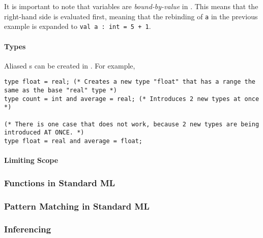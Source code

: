 It is important to note that variables are \emph{bound-by-value} in .
This means that the right-hand side is evaluated first, meaning that the rebinding of \texttt{a} in the previous example is expanded to \texttt{val a : int = 5 + 1}.

\paragraph{Types}\label{par:Functional-SML-Type_Declarations}
Aliased s can be created in .
For example,
\begin{verbatim}
type float = real; (* Creates a new type "float" that has a range the same as the base "real" type *)
type count = int and average = real; (* Introduces 2 new types at once *)

(* There is one case that does not work, because 2 new types are being introduced AT ONCE. *)
type float = real and average = float;
\end{verbatim}

\paragraph{Limiting Scope}\label{par:Functional-SML-Limit_Scope}

\subsubsection{Functions in Standard ML}\label{subsubsec:Functional-SML-Functions}

\subsubsection{Pattern Matching in Standard ML}\label{subsubsec:Functional-SML-Pattern_Matching}
\begin{definition}\label{def:Pattern_Matching}
  
\end{definition}

\subsubsection{ Inferencing}\label{subsubsec:Functional-SML-Data_Type_Inferencing}
\begin{definition}\label{def:Functional-SML-Data_Type_Inferencing}
  
\end{definition}

